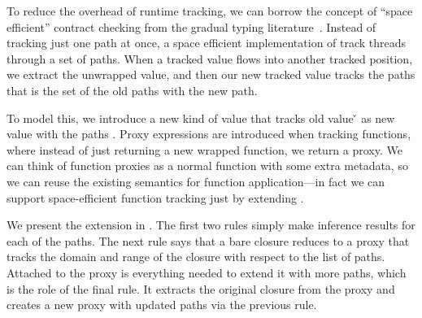 
To reduce the overhead of runtime tracking, we can borrow
the concept of ``space efficient'' contract checking from
the gradual typing literature~\cite{Herman:2010}.
%
Instead of tracking just one path at once, a space efficient
implementation of track threads through a set of paths.
When a tracked value flows into another tracked position,
we extract the unwrapped value, and then our new tracked value
tracks the paths that is the set of the old paths with the new path.

To model this, we introduce a new kind of value \ProxyV{\v{}}{\closure{\e{}}{\openv{}}}{\ova{\inferpath{}}}
that tracks old value \v{} as new value \closure{\e{}}{\openv{}} with the paths \ova{\inferpath{}}.
Proxy expressions are introduced when tracking functions, where instead of just returning
a new wrapped function, we return a proxy.
We can think of function proxies as a normal function with some extra metadata, so we
can reuse the existing semantics for function application---in fact we
can support space-efficient function tracking just by extending \trackEOp{}.

We present the extension in .
The first two \trackEOp{} rules simply make inference
results for each of the paths.
The next rule says that a bare closure
reduces to a proxy that tracks the domain and range
of the closure with respect to the list of paths.
Attached to the proxy is everything needed to extend
it with more paths, which is the role of the
final rule. It extracts the original closure from the
proxy and creates a new proxy with updated paths
via the previous rule.

